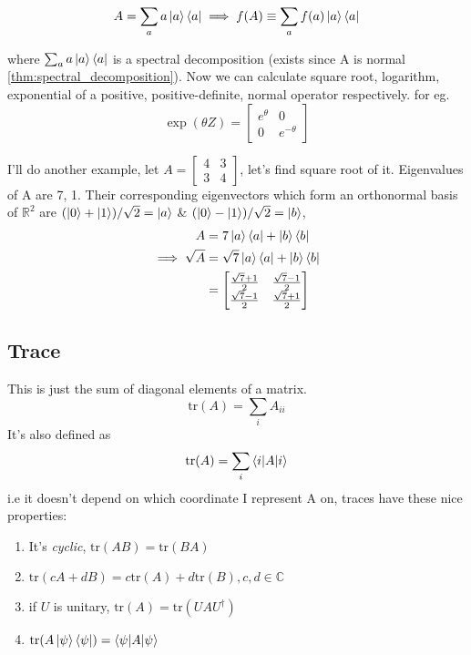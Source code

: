 \begin{equation}
    A = \sum_a a\ket{a}\bra{a} \implies
    f(A) \equiv \sum_a f(a)\ket{a}\bra{a}
\end{equation}

where $\sum_a a\ket{a}\bra{a}$ is a spectral decomposition (exists since A is normal \ref{thm:spectral_decomposition}). Now we can calculate square root, logarithm, exponential of a positive, positive-definite, normal operator respectively.
for eg.
\begin{equation}
    \exp{(\theta Z)} =
    \begin{bmatrix}
        e^\theta  & 0 \\
        0 & e^{-\theta}
    \end{bmatrix}
\end{equation}

I'll do another example, let $A = \begin{bmatrix}
    4 & 3 \\ 3 & 4
\end{bmatrix}$, let's find square root of it.
Eigenvalues of A are 7, 1. Their corresponding eigenvectors which form an orthonormal basis of $\mathbb{R}^2$ are $(\ket{0} + \ket{1})/\sqrt{2} = \ket{a}$ \& $(\ket{0}-\ket{1})/\sqrt{2} = \ket{b}$,
\begin{align}
    A &= 7\ket{a}\bra{a} + \ket{b}\bra{b} \\
    \implies \sqrt{A} &= \sqrt{7}\ket{a}\bra{a} + \ket{b}\bra{b} \\
    &= \begin{bmatrix}
        \frac{\sqrt{7} + 1}{2} & \frac{\sqrt{7}-1}{2}\\
        \frac{\sqrt{7}-1}{2} & \frac{\sqrt{7} + 1}{2} 
    \end{bmatrix}
\end{align}

\subsection{Trace}
This is just the sum of diagonal elements of a matrix. 
\newcommand{\tr}[1]{\text{tr}(#1)}
\begin{equation}
    \tr{A} = \sum_i A_{ii}
\end{equation}
It's also defined as
\begin{equation}
    \tr{A} = \sum_i \braket{i|A|i}
\end{equation}
i.e it doesn't depend on which coordinate I represent A on, traces have these nice properties:
\begin{enumerate}
    \item It's \textit{cyclic}, $\tr{AB} = \tr{BA}$
    \item $\tr{cA + dB} = c\tr{A} + d\tr{B}, c,d \in \mathbb{C}$
    \item if $U$ is unitary, $\tr{A} = \tr{UAU^{\dag}}$   
    \item $\tr{A\ket{\psi}\bra{\psi}} = \braket{\psi|A|\psi}$
\end{enumerate}


